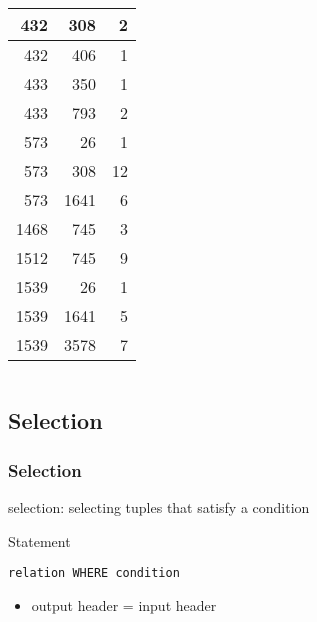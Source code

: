 \documentclass[dvipsnames]{beamer}
\theoremstyle{plain}
\begin{document}
\begin{frame}
\begin{example}[CASTING]
\begin{columns}[b]
      \begin{tiny}
      \begin{table}
        \begin{tabular}{|r|r|r|}\hline
    432 &     308 &   2\\\hline
    432 &     406 &   1\\\hline
    433 &     350 &   1\\\hline
    433 &     793 &   2\\\hline
    573 &      26 &   1\\\hline
    573 &     308 &  12\\\hline
    573 &    1641 &   6\\\hline
   1468 &     745 &   3\\\hline
   1512 &     745 &   9\\\hline
   1539 &      26 &   1\\\hline
   1539 &    1641 &   5\\\hline
   1539 &    3578 &   7\\\hline
        \end{tabular}
      \end{table}
      \end{tiny}
    \end{columns}
  \end{example}
\end{frame}

\subsection{Selection}

\begin{frame}[fragile]
  \frametitle{Selection}

  \begin{definition}
    \alert{selection}: selecting tuples that satisfy a condition
  \end{definition}

  \pause
  \begin{block}{Statement}
    \begin{lstlisting}
relation WHERE condition
    \end{lstlisting}
  \end{block}

  \pause
  \begin{itemize}
    \item output header = input header
  \end{itemize}
\end{frame}
\end{document}
